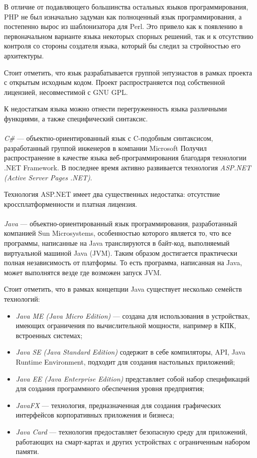В отличие от подавляющего большинства остальных языков программирования,
PHP не был изначально задуман как полноценный язык программирования,
а постепенно вырос из шаблонизатора для Perl. Это привело как к появлению в
первоначальном варианте языка некоторых спорных решений, так и
к отсутствию контроля со стороны создателя языка, который бы следил за
стройностью его архитектуры.

Стоит отметить, что язык разрабатывается группой энтузиастов в рамках проекта
с открытым исходным кодом. Проект распространяется под собственной лицензией,
несовместимой с GNU GPL.

К недостаткам языка можно отнести перегруженность языка различными функциями,
а также специфический синтаксис.

\paragraph{}
\textit{C\#} --- объектно-ориентированный язык с C-подобным синтаксисом, разработанный
группой инженеров в компании Microsoft Получил распространение в качестве
языка веб-программирования благодаря технологии .NET Framework.
В последнее время активно развивается технология
\textit{ASP.NET (Active Server Pages .NET)}.

Технология ASP.NET имеет два существенных недостатка: отсутствие кроссплатформенности и
платная лицензия.

\paragraph{}
\textit{Java} --- объектно-ориентированный язык программирования, разработанный
компанией Sun Microsystems, особенностью которого является то, что все программы,
написанные на Java транслируются в байт-код, выполняемый виртуальной машиной Java (JVM).
Таким образом достигается практически полная независимость от платформы. То есть
программа, написанная на Java, может выполнятся везде где возможен запуск JVM.

Стоит отметить, что в рамках концепции Java существует несколько семейств технологий:
\begin{itemize}
  \item \textit{Java ME (Java Micro Edition)} --- создана для использования в устройствах,
    имеющих ограничения по вычислительной мощности, например в КПК, встроенных системах;
  \item \textit{Java SE (Java Standard Edition)} содержит в себе компиляторы, API, Java Runtime
    Environment, подходит для создания настольных приложений;
  \item \textit{Java EE (Java Enterprise Edition)} представляет собой набор спецификаций для
    создания программного обеспечения уровня предприятия;
  \item \textit{JavaFX} --- технология, предназначенная для создания графических интерфейсов
    корпоративных приложения и бизнеса;
  \item \textit{Java Card} --- технология предоставляет безопасную среду для приложений, работающих
    на смарт-картах и других устройствах с ограниченным набором памяти.
\end{itemize}

